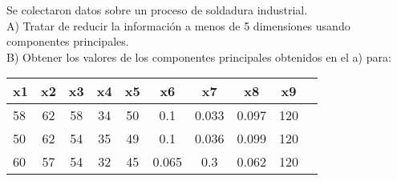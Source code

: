 \begin{problem}{3}
Se colectaron datos sobre un proceso de soldadura industrial.\\
A) Tratar de reducir la información a menos de 5 dimensiones usando componentes principales.\\
B) Obtener los valores de los componentes principales obtenidos en el a) para:
\begin{table}[h]
    \centering
    \begin{tabular}{lccccccccc}
        \toprule
        \textbf{x1} & \textbf{x2} & \textbf{x3} & \textbf{x4} & \textbf{x5} & \textbf{x6} & \textbf{x7} & \textbf{x8} & \textbf{x9} \\
        \midrule
        58 & 62 & 58 & 34 & 50 & 0.1 & 0.033 & 0.097 & 120 \\
        50 & 62 & 54 & 35 & 49 & 0.1 & 0.036 & 0.099 & 120 \\
        60 & 57 & 54 & 32 & 45 & 0.065 & 0.3 & 0.062 & 120 \\
        \bottomrule
    \end{tabular}
    \label{tab:datos}
\end{table}
\end{problem}



